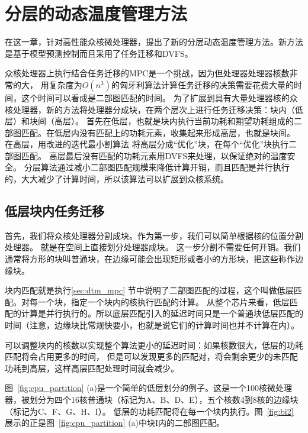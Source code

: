 
\chapter{分层的动态温度管理方法}\label{sec:new_method}

在这一章，针对高性能众核微处理器，提出了新的分层动态温度管理方法。新方法是基于模型预测控制而且采用了任务迁移和DVFS。

众核处理器上执行结合任务迁移的MPC是一个挑战，因为但处理器处理器核数非常的大，
用复杂度为$O(n^{3})$的匈牙利算法计算任务迁移的决策需要花费大量的时间，这个时间可以看成是二部图匹配的时间。
为了扩展到具有大量处理器核的众核处理器，新的方法将处理器分成块，在两个层次上进行任务迁移决策：块内（低层）和块间（高层）。
首先在低层，也就是块内执行当前功耗和期望功耗组成的二部图匹配。在低层内没有匹配上的功耗元素，收集起来形成高层，也就是块间。
在高层，用改进的迭代最小割算法  \cite{Fidducia:DAC'82}  将高层分成“优化”块，在每个“优化”块执行二部图匹配。
高层最后没有匹配的功耗元素用DVFS来处理，以保证绝对的温度安全。
分层算法通过减小二部图匹配规模来降低计算开销，而且匹配是并行执行的，大大减少了计算时间，所以该算法可以扩展到众核系统。

\section{低层块内任务迁移}\label{sec:parts}

首先，我们将众核处理器分割成块。作为第一步，我们可以简单根据核的位置分割处理器。
就是在空间上直接划分处理器成块。
这一步分割不需要任何开销。我们通常将方形的块叫普通块，在边缘可能会出现矩形或者小的方形块，把这些称作边缘块。

块内匹配就是执行\ref{sec:dtm_mpc} 节中说明了二部图匹配的过程，这个叫做低层匹配。对每一个块，指定一个块内的核执行匹配的计算。
从整个芯片来看，低层匹配的计算是并行执行的。所以底层匹配引入的延迟时间只是一个普通块低层匹配的时间（注意，边缘块比常规快要小，也就是说它们的计算时间也并不计算在内）。

可以调整块内的核数以实现整个算法更小的延迟时间：如果核数很大，低层的功耗匹配将会占用更多的时间，
但是可以发现更多的匹配对，将会剩余更少的未匹配功耗到高层，这样高层匹配处理时间就会减少。

图~\ref{fig:cpu_partition} (a)是一个简单的低层划分的例子。这是一个100核微处理器，被划分为四个16核普通块（标记为A、B、D、E），五个核数4到8核的边缘块（标记为C、F、G、H、I）。
低层的功耗匹配将在每一个块内执行。图~\ref{fig:bi2} 展示的正是图~\ref{fig:cpu_partition} (a)中块I内的二部图匹配。

